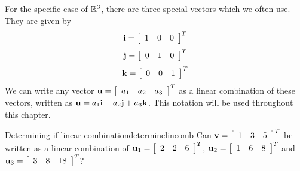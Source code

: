 For the specific case of $\mathbb{R}^3$, there are three special vectors which we often use. 
They are given by 
\begin{equation*}
{\bf i} = 
\left[
\begin{array}{rrr}
1 & 0 & 0
\end{array}
\right]^T
\end{equation*}
\begin{equation*}
{\bf j} = 
\left[
\begin{array}{rrr}
0 & 1 & 0
\end{array}
\right]^T
\end{equation*}
\begin{equation*}
{\bf k} = 
\left[
\begin{array}{rrr}
0 & 0 & 1
\end{array}
\right]^T
\end{equation*}
We can write any vector ${\bf u} = 
\left[
\begin{array}{rrr}
a_1 & a_2 & a_3
\end{array}
\right]^T$
as a linear combination of these vectors, written as ${\bf u} = a_1 {\bf i} + a_2 {\bf j} + a_3 {\bf k}$. This notation will be used throughout 
this chapter.

\begin{example}{Determining if linear combination}{determinelincomb}
Can ${\bf v}=\left[ \begin{array}{rrr}1 & 3 & 5 \end{array} \right]^T$ be written as a linear combination of ${\bf u}_1=\left[ \begin{array}{rrr}2 & 2 & 6 \end{array} \right]^T$, ${\bf u}_2=\left[ \begin{array}{rrr}1 & 6 & 8 \end{array} \right]^T$ and ${\bf u}_3=\left[ \begin{array}{rrr}3 & 8 & 18 \end{array} \right]^T$?
\end{example}

